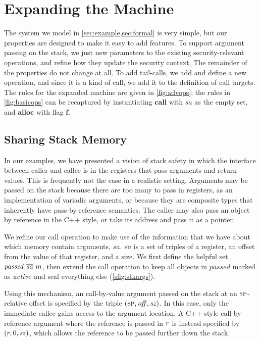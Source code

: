 \documentclass[10pt,conference]{ieeetran}%
\theoremstyle{definition}
\begin{document}
\section{Expanding the Machine}
\label{sec:extensions}

The system we model in \cref{sec:example,sec:formal} is very simple, but our properties
are designed to make it easy to add features. To support argument passing on the stack,
we just new parameters to the existing security-relevant operations, and refine how they
update the security context. The remainder of the properties do not change at all.
To add tail-calls, we add and define a new operation, and since it is a kind of call,
we add it to the definition of call targets.
The rules for the expanded machine are given in \cref{fig:advops}; the
rules in \cref{fig:basicops} can be recaptured by instantiating
\(\mathbf{call}\) with \(\overline{sa}\) as the empty set, and \(\mathbf{alloc}\)
with flag \(\mathbf{f}\).

\subsection{Sharing Stack Memory}
In our examples, we have presented a vision of stack safety in which
the interface between caller and callee is in the registers that pass
arguments and return values. This is frequently not the case in a realistic
setting. Arguments may be passed on the stack because there are too many
to pass in registers, as an implementation of variadic arguments, or
because they are composite types that inherently have
pass-by-reference semantics. The caller may also pass an object by reference
in the C++ style, or take its address and pass it as a pointer.

We refine our call operation to make use of the information that we have about
which memory contain arguments, \(\overline{sa}\). \(\overline{sa}\) is a set of
triples of a register, an offset from the value of that register, and a size.
We first define the helpful set \(\mathit{passed} ~ \overline{sa} ~ m\),
then extend the call operation to keep all objects in \(\mathit{passed}\) marked
as \(\mathit{active}\) and seal everything else (\cref{sfig:stkargs}).  

Using this mechanism, an call-by-value argument passed on the stack at an \(\textsc{sp}\)-relative offset
is specified by the triple \((\textsc{sp}, \mathit{off}, \mathit{sz})\).
In this case, only the immediate callee gains access to the argument location.
A C++-style call-by-reference argument where the reference is passed in \(r\)
is instead specified by \((r, 0, \mathit{sz})\), which allows
the reference to be passed further down the stack.
\end{document}
